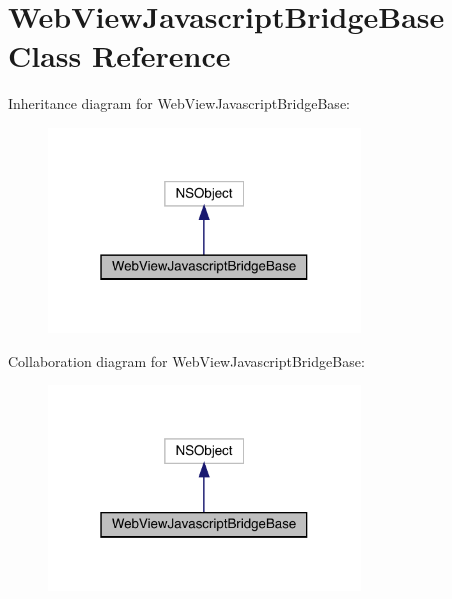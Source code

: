 \hypertarget{interface_web_view_javascript_bridge_base}{}\section{Web\+View\+Javascript\+Bridge\+Base Class Reference}
\label{interface_web_view_javascript_bridge_base}


Inheritance diagram for Web\+View\+Javascript\+Bridge\+Base\+:\nopagebreak
\begin{figure}[H]
\begin{center}
\leavevmode
\includegraphics[width=235pt]{interface_web_view_javascript_bridge_base__inherit__graph}
\end{center}
\end{figure}


Collaboration diagram for Web\+View\+Javascript\+Bridge\+Base\+:\nopagebreak
\begin{figure}[H]
\begin{center}
\leavevmode
\includegraphics[width=235pt]{interface_web_view_javascript_bridge_base__coll__graph}
\end{center}
\end{figure}
